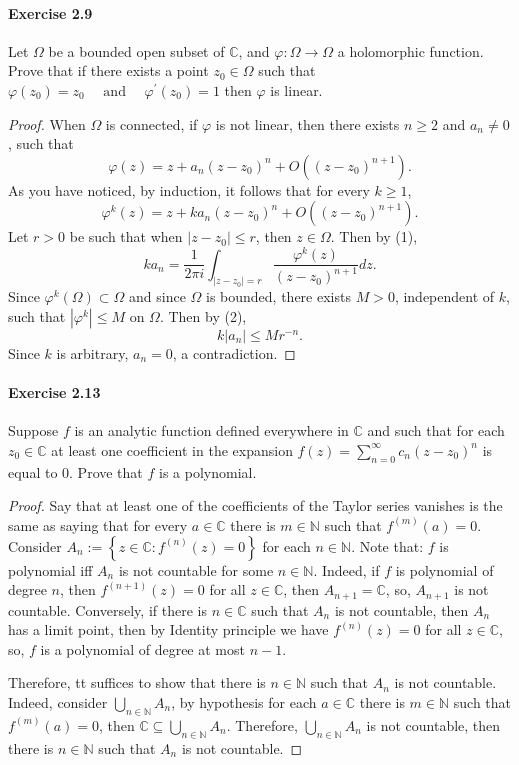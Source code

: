 \documentclass{article}
\begin{document}
\paragraph{Exercise 2.9} Let $\Omega$ be a bounded open subset of $\mathbb{C}$, and $\varphi: \Omega \rightarrow \Omega$ a holomorphic function. Prove that if there exists a point $z_{0} \in \Omega$ such that $\varphi\left(z_{0}\right)=z_{0} \quad \text { and } \quad \varphi^{\prime}\left(z_{0}\right)=1$ then $\varphi$ is linear.
\begin{proof}
    When $\Omega$ is connected, if $\varphi$ is not linear, then there exists $n \geq 2$ and $a_n \neq 0$, such that
$$
\varphi(z)=z+a_n\left(z-z_0\right)^n+O\left(\left(z-z_0\right)^{n+1}\right) .
$$
As you have noticed, by induction, it follows that for every $k \geq 1$,
$$
\varphi^k(z)=z+k a_n\left(z-z_0\right)^n+O\left(\left(z-z_0\right)^{n+1}\right) .
$$
Let $r>0$ be such that when $\left|z-z_0\right| \leq r$, then $z \in \Omega$. Then by (1),
$$
k a_n=\frac{1}{2 \pi i} \int_{\left|z-z_0\right|=r} \frac{\varphi^k(z)}{\left(z-z_0\right)^{n+1}} d z .
$$
Since $\varphi^k(\Omega) \subset \Omega$ and since $\Omega$ is bounded, there exists $M>0$, independent of $k$, such that $\left|\varphi^k\right| \leq M$ on $\Omega$. Then by (2),
$$
k\left|a_n\right| \leq M r^{-n} .
$$
Since $k$ is arbitrary, $a_n=0$, a contradiction.
\end{proof}



\paragraph{Exercise 2.13} Suppose $f$ is an analytic function defined everywhere in $\mathbb{C}$ and such that for each $z_0 \in \mathbb{C}$ at least one coefficient in the expansion $f(z) = \sum_{n=0}^\infty c_n(z - z_0)^n$ is equal to 0. Prove that $f$ is a polynomial.
\begin{proof}
Say that at least one of the coefficients of the Taylor series vanishes is the same as saying that for every $a \in \mathbb{C}$ there is $m \in \mathbb{N}$ such that $f^{(m)}(a)=0$.
Consider $A_n:=\left\{z \in \mathbb{C}: f^{(n)}(z)=0\right\}$ for each $n \in \mathbb{N}$. Note that:
$f$ is polynomial iff $A_n$ is not countable for some $n \in \mathbb{N}$.
Indeed, if $f$ is polynomial of degree $n$, then $f^{(n+1)}(z)=0$ for all $z \in \mathbb{C}$, then $A_{n+1}=\mathbb{C}$, so, $A_{n+1}$ is not countable. Conversely, if there is $n \in \mathbb{C}$ such that $A_n$ is not countable, then $A_n$ has a limit point, then by Identity principle we have $f^{(n)}(z)=0$ for all $z \in \mathbb{C}$, so, $f$ is a polynomial of degree at most $n-1$.

Therefore, tt suffices to show that there is $n \in \mathbb{N}$ such that $A_n$ is not countable. Indeed, consider $\bigcup_{n \in \mathbb{N}} A_n$, by hypothesis for each $a \in \mathbb{C}$ there is $m \in \mathbb{N}$ such that $f^{(m)}(a)=0$, then $\mathbb{C} \subseteq \bigcup_{n \in \mathbb{N}} A_n$. Therefore, $\bigcup_{n \in \mathbb{N}} A_n$ is not countable, then there is $n \in \mathbb{N}$ such that $A_n$ is not countable.
\end{proof}
 
\end{document}
